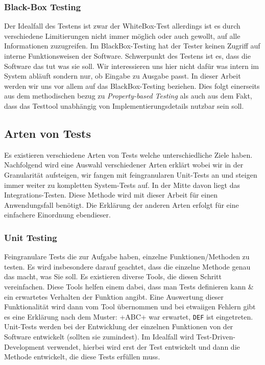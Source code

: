 \subsubsection{Black-Box Testing}

Der Idealfall des Testens ist zwar der WhiteBox-Test allerdings ist es durch verschiedene Limitierungen nicht immer möglich oder auch gewollt,
auf alle Informationen zuzugreifen.
Im BlackBox-Testing hat der Tester keinen Zugriff auf interne Funktionsweisen der Software.
Schwerpunkt des Testens ist es, dass die Software das tut was sie soll.
Wir interessieren uns hier nicht dafür was intern im System abläuft sondern nur, ob Eingabe zu Ausgabe passt.
In dieser Arbeit werden wir uns vor allem auf das BlackBox-Testing beziehen.
Dies folgt einerseits aus dem methodischen bezug zu \textit{Property-based Testing}\cite{property-based-testing}
als auch aus dem Fakt, dass das Testtool unabhängig von Implementierungsdetails nutzbar sein soll.

\subsection{Arten von Tests}

Es existieren verschiedene Arten von Tests welche unterschiedliche Ziele haben.
Nachfolgend wird eine Auswahl verschiedener Arten erklärt wobei wir in der Granularität aufsteigen, wir fangen mit feingranularen Unit-Tests an
und steigen immer weiter zu kompletten System-Tests auf.
In der Mitte davon liegt das Integrations-Testen.
Diese Methode wird mit dieser Arbeit für einen Anwendungsfall benötigt.
Die Erklärung der anderen Arten erfolgt für eine einfachere Einordnung ebendieser.

\subsubsection{Unit Testing}

Feingranulare Tests die zur Aufgabe haben, einzelne Funktionen/Methoden zu testen.
Es wird insbesondere darauf geachtet, dass die einzelne Methode genau das macht, was Sie soll.
Es existieren diverse Tools, die diesen Schritt vereinfachen.
Diese Tools helfen einem dabei, dass man Tests definieren kann \& ein erwartetes Verhalten der Funktion angibt.
Eine Auswertung dieser Funktionalität wird dann vom Tool übernommen und bei etwaiigen Fehlern gibt es eine Erklärung
nach dem Muster: \vern+ABC+ war erwartet, \verb+DEF+ ist eingetreten.
Unit-Tests werden bei der Entwicklung der einzelnen Funktionen von der Software entwickelt (sollten sie zumindest).
Im Idealfall wird Test-Driven-Development verwendet, hierbei wird erst der Test entwickelt und dann die Methode entwickelt,
die diese Tests erfüllen muss.

